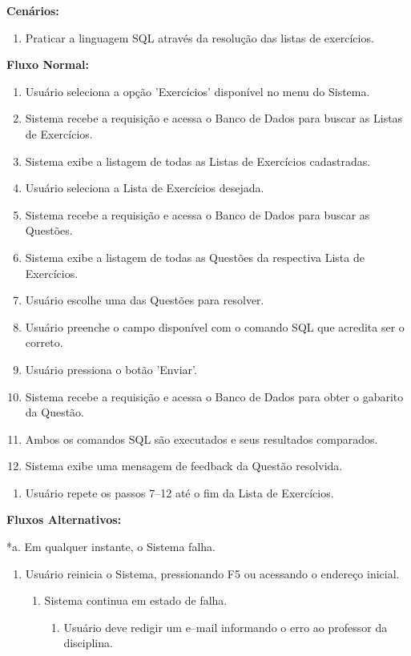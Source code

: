 \documentclass[graduacao,brazil]{ThesisPUC}
\begin{document}
\textbf{Cen\'{a}rios:}

\begin{enumerate}
  \item Praticar a linguagem SQL atrav\'{e}s da resolu\c{c}\~{a}o das listas de exerc\'{i}cios.
\end{enumerate}

\textbf{Fluxo Normal:}

\begin{enumerate}
  \item Usu\'{a}rio seleciona a opção 'Exerc\'{i}cios' dispon\'{i}vel no menu do Sistema.
  \item Sistema recebe a requisi\c{c}\~{a}o e acessa o Banco de Dados para buscar as Listas de Exerc\'{i}cios.
  \item Sistema exibe a listagem de todas as Listas de Exerc\'{i}cios cadastradas.
  \item Usu\'{a}rio seleciona a Lista de Exerc\'{i}cios desejada.
  \item Sistema recebe a requisi\c{c}\~{a}o e acessa o Banco de Dados para buscar as Quest\~{o}es.
  \item Sistema exibe a listagem de todas as Quest\~{o}es da respectiva Lista de Exerc\'{i}cios.
  \item Usu\'{a}rio escolhe uma das Quest\~{o}es para resolver.
  \item Usu\'{a}rio preenche o campo dispon\'{i}vel com o comando SQL que acredita ser o correto.
  \item Usu\'{a}rio pressiona o bot\~{a}o 'Enviar'.
  \item Sistema recebe a requisi\c{c}\~{a}o e acessa o Banco de Dados para obter o gabarito da Quest\~{a}o.
  \item Ambos os comandos SQL s\~{a}o executados e seus resultados comparados.
  \item Sistema exibe uma mensagem de feedback da Quest\~{a}o resolvida.
\end{enumerate}

\begin{enumerate}[I]
  \item Usu\'{a}rio repete os passos 7--12 at\'{e} o fim da Lista de Exerc\'{i}cios.
\end{enumerate}

\textbf{Fluxos Alternativos:}

*a. Em qualquer instante, o Sistema falha.

\begin{enumerate}
  \item Usu\'{a}rio reinicia o Sistema, pressionando F5 ou acessando o endere\c{c}o inicial.
  \begin{enumerate}
    \item Sistema continua em estado de falha.
    \begin{enumerate}
      \item Usu\'{a}rio deve redigir um e--mail informando o erro ao professor da disciplina.
    \end{enumerate}
  \end{enumerate}
\end{enumerate}
\end{document}

